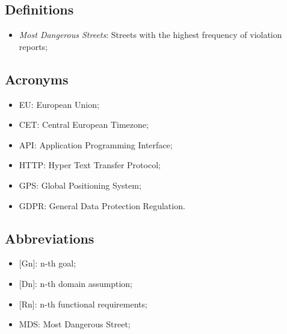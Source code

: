 \subsection{Definitions}
\begin{itemize}
  \item \textit{Most Dangerous Streets}: Streets with the highest frequency of violation reports;
\end{itemize}

\subsection{Acronyms}
\begin{itemize}
  \item EU: European Union;
  \item CET: Central European Timezone;
  \item API: Application Programming Interface;
  \item HTTP: Hyper Text Transfer Protocol;
  \item GPS: Global Positioning System;
  \item GDPR: General Data Protection Regulation.
\end{itemize}

\subsection{Abbreviations}
\begin{itemize}
  \item {[Gn]}: n-th goal;
  \item {[Dn]}: n-th domain assumption;
  \item {[Rn]}: n-th functional requirements;
  \item MDS: Most Dangerous Street;
\end{itemize}
